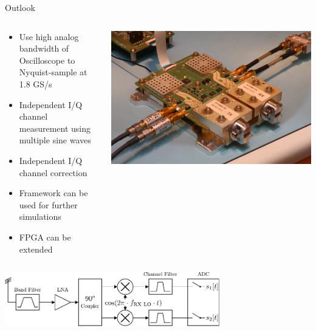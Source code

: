 \documentclass[10pt]{beamer}
\begin{document}
\begin{frame}{Outlook}

  \begin{columns}[T]
    \begin{column}{.6\textwidth}
      \begin{itemize}
      \item Use high analog bandwidth of Oscilloscope to Nyquist-sample at 1.8 GS/s
      \item Independent I/Q channel measurement using multiple sine waves
      \item Independent I/Q channel correction
      \item Framework can be used for further simulations
      \item FPGA can be extended
      \end{itemize}
    \end{column}
    \begin{column}{.4\textwidth}
      \includegraphics[width=\textwidth]{pictures/sivers}
    \end{column}
  \end{columns}

  \includegraphics[width=0.7\textwidth]{figures/rx_2_bd} \\
\end{frame}
\end{document}
